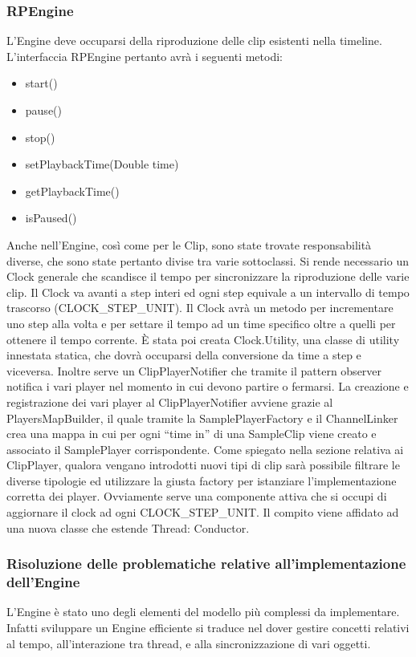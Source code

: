 \documentclass[a4paper,12pt]{report}
\begin{document}
\subsubsection{RPEngine}
L’Engine deve occuparsi della riproduzione delle clip esistenti nella timeline.
L’interfaccia RPEngine pertanto avrà i seguenti metodi:
\begin{itemize}
    \item start()
    \item pause()
    \item stop()
    \item setPlaybackTime(Double time)
    \item getPlaybackTime()
    \item isPaused()
\end{itemize}
Anche nell’Engine, così come per le Clip, sono state trovate responsabilità diverse, che sono state pertanto divise tra varie sottoclassi.
Si rende necessario un Clock generale che scandisce il tempo per sincronizzare la riproduzione delle varie clip.
Il Clock va avanti a step interi ed ogni step equivale a un intervallo di tempo trascorso (CLOCK\_STEP\_UNIT).
Il Clock avrà un metodo per incrementare uno step alla volta e per settare il tempo ad un time specifico oltre a quelli per ottenere il tempo corrente.
È stata poi creata Clock.Utility, una classe di utility innestata statica, che dovrà occuparsi della conversione da time a step e viceversa.
Inoltre serve un ClipPlayerNotifier che tramite il pattern observer notifica i vari player nel momento in cui devono partire o fermarsi.
La creazione e registrazione dei vari player al ClipPlayerNotifier avviene grazie al PlayersMapBuilder, il quale tramite la SamplePlayerFactory e il ChannelLinker crea una mappa in cui per ogni “time in” di una SampleClip viene creato e associato il SamplePlayer corrispondente.
Come spiegato nella sezione relativa ai ClipPlayer, qualora vengano introdotti nuovi tipi di clip sarà possibile filtrare le diverse tipologie ed utilizzare la giusta factory per istanziare l’implementazione corretta dei player.
Ovviamente serve una componente attiva che si occupi di aggiornare il clock ad ogni CLOCK\_STEP\_UNIT. Il compito viene affidato ad una nuova classe che estende Thread: Conductor.
\subsubsection{Risoluzione delle problematiche relative all’implementazione dell’Engine}
L’Engine è stato uno degli elementi del modello più complessi da implementare. Infatti sviluppare un Engine efficiente si traduce nel dover gestire concetti relativi al tempo, all’interazione tra thread, e alla sincronizzazione di vari oggetti.
\end{document}
